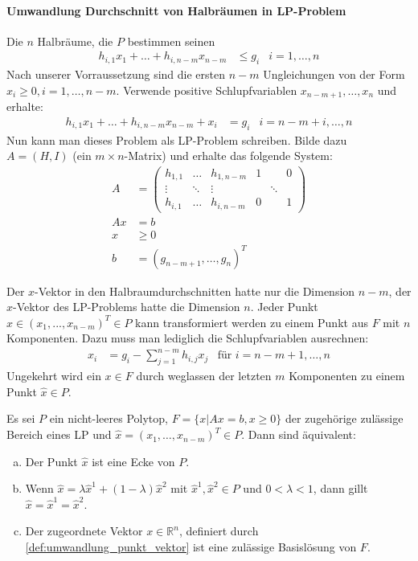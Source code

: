 \paragraph*{Umwandlung  Durchschnitt von Halbräumen in LP-Problem}
Die $n$ Halbräume, die $P$ bestimmen seinen
\begin{align*}
h_{i,1} x_1 + \dotsc + h_{i,n-m} x_{n-m} &\leq g_i & i = 1,\dotsc,n
\end{align*}
Nach unserer Vorraussetzung sind die ersten $n-m$ Ungleichungen von der Form $x_i \geq 0, i = 1,\dotsc,n-m$.
Verwende positive Schlupfvariablen $x_{n-m+1}, \dotsc , x_n$ und erhalte:
\begin{align*}
h_{i,1} x_1 + \dotsc + h_{i,n-m} x_{n-m} + x_i &= g_i & i = n-m+i,\dotsc,n
\end{align*} 
Nun kann man dieses Problem als LP-Problem schreiben. Bilde dazu $A = ( H, I )$ (ein $m\times n$-Matrix) und erhalte das folgende System:
\begin{align*}
A &= \begin{pmatrix}
h_{1,1} & \hdots & h_{1,n-m} & 1 && 0\\
\vdots & \ddots & \vdots && \ddots & \\
h_{i,1} & \hdots & h_{i,n-m} & 0 && 1
\end{pmatrix}\\
Ax &= b\\
x &\geq 0\\
b &= (g_{n-m+1},\dotsc,g_n)^T
\end{align*}
\begin{definition}\label{def:umwandlung_punkt_vektor}
Der $x$-Vektor in den Halbraumdurchschnitten hatte nur die Dimension $n-m$, der $x$-Vektor des LP-Problems hatte die Dimension $n$. 
Jeder Punkt $\hat{x} \in (x_1,...,x_{n-m})^T \in P$ kann transformiert werden zu einem Punkt aus $F$ mit $n$ Komponenten. Dazu muss man lediglich die Schlupfvariablen ausrechnen:
\begin{align*}
x_i &= g_i - \sum_{j=1}^{n-m} h_{i,j}x_j & \text{für $i=n-m+1,\dotsc,n$}
\end{align*}
Ungekehrt wird ein $x\in F$ durch weglassen der letzten $m$ Komponenten zu einem Punkt $\hat{x} \in P$.
\end{definition}
\begin{theorem}
Es sei $P$ ein nicht-leeres Polytop, $F=\{x | Ax = b, x\geq 0\}$ der zugehörige zulässige Bereich eines LP und $\hat{x} = (x_1,\dotsc,x_{n-m})^T \in P$. Dann sind äquivalent:
\begin{enumerate}[a)]
\item Der Punkt $\hat{x}$ ist eine Ecke von $P$.
\item Wenn $\hat{x} = \lambda \hat{x}^1 + (1-\lambda)\hat{x}^2$ mit $\hat{x}^1,\hat{x}^2 \in P$ und $0 < \lambda < 1$, dann gillt $\hat{x} = \hat{x}^1 = \hat{x}^2$.
\item Der zugeordnete Vektor $x \in \mathbb R^n$, definiert durch \ref{def:umwandlung_punkt_vektor} ist eine zulässige Basislösung von $F$.
\end{enumerate}
\end{theorem}
